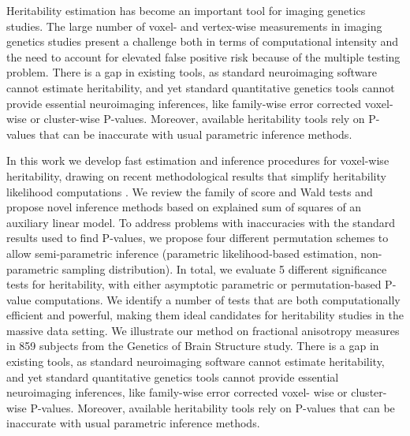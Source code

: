 \documentclass[11pt,a4paper]{report}      %
\begin{document}
%
\begin{thesisabstract}
Heritability estimation has become an important tool for imaging genetics studies. The large number of voxel- and vertex-wise measurements in imaging genetics studies present a challenge both in terms of computational intensity and the need to account for elevated false positive risk because of the multiple testing problem. There is a gap in existing tools, as standard neuroimaging software cannot estimate heritability, and yet standard quantitative genetics tools cannot provide essential neuroimaging inferences, like family-wise error corrected voxel- wise or cluster-wise P-values. Moreover, available heritability tools rely on  P-values that can be inaccurate with usual parametric inference methods.
 
In this work we develop fast estimation and inference procedures for voxel-wise heritability, drawing on recent methodological results that simplify heritability likelihood computations \citep{Blangero2013}. We review the family of score and Wald tests and propose novel inference methods based on explained sum of squares of an auxiliary linear model. To address problems with inaccuracies with the standard results used to find P-values, we propose four different permutation schemes to allow semi-parametric inference (parametric likelihood-based estimation, non-parametric sampling distribution). In total, we evaluate 5 different significance tests for heritability, with either asymptotic parametric or permutation-based P-value computations. We identify a number of tests that are both computationally efficient and powerful, making them ideal candidates for heritability studies in the massive data setting. We illustrate our method on fractional anisotropy measures in 859 subjects from the Genetics of Brain Structure study.
There is a gap in existing tools, as standard neuroimaging software cannot estimate heritability, and yet standard quantitative genetics tools cannot provide essential neuroimaging inferences, like family-wise error corrected voxel- wise or cluster-wise P-values. Moreover, available heritability tools rely on  P-values that can be inaccurate with usual parametric inference methods.

\end{thesisabstract}
\end{document}
